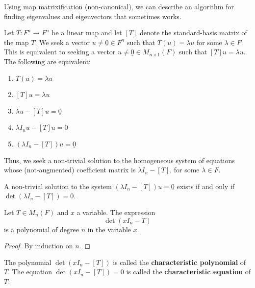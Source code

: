 \begin{note} Using map matrixification (non-canonical), we can describe an
algorithm for finding eigenvalues and eigenvectors that sometimes works.
\end{note}

\begin{theorem*}\label{thm:
eigenproblem-matrix} Let $T: F^n \to F^n$ be a linear map and let $[T]$ denote
the standard-basis matrix of the map $T$. We seek a vector $u \neq \underline{0}
\in F^n$ such that $T(u) = \lambda u$ for some $\lambda \in F$. This is
equivalent to seeking a vector $u \neq \underline{0} \in M_{n \times 1}(F)$ such
that $[T]u = \lambda u$. The following are equivalent:
\begin{enumerate}[label=(\roman*)] \item $T(u) = \lambda u$ \item $[T]u =
\lambda u$ \item $\lambda u - [T]u = \underline{0}$ \item $\lambda I_n u - [T]u
= \underline{0}$ \item $(\lambda I_n - [T])u = \underline{0}$ \end{enumerate}
Thus, we seek a non-trivial solution to the homogeneous system of equations
whose (not-augmented) coefficient matrix is $\lambda I_n - [T]$, for some
$\lambda \in F$. \end{theorem*}

\begin{note} A non-trivial solution to the system $(\lambda I_n - [T])u =
\underline{0}$ exists if and only if $\det(\lambda I_n - [T]) = 0$. \end{note}

\begin{theorem}\label{thm:characteristic-polynomial}
Let $T \in M_n(F)$ and $x$ a variable. The expression \[ \det(xI_n - T) \] is a
polynomial of degree $n$ in the variable $x$. \end{theorem}

\begin{proof} By induction on $n$. \end{proof}

\begin{definition*}\label{def:
characteristic} The polynomial $\det(xI_n - [T])$ is called the
\textbf{characteristic polynomial} of $T$. The equation $\det(xI_n - [T]) = 0$
is called the \textbf{characteristic equation} of $T$. \end{definition*}

